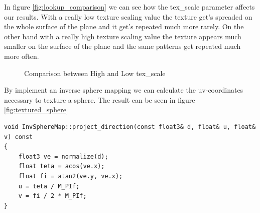 In figure \ref{fig:lookup_comparison} we can see how the tex\_scale parameter affects our results. With a really low texture scaling value the texture get's spreaded on the whole surface of the plane and it get's repeated much more rarely. On the other hand with a really high texture scaling value the texture appears much smaller on the surface of the plane and the same patterns get repeated much more often.
\begin{figure}[H]
	\centering
	\qquad
	
	\caption{Comparison between High and Low tex\_scale}%
	\label{fig:tex_scale_comparison}%
\end{figure}
By implement an inverse sphere mapping we can calculate the uv-coordinates necessary to texture a sphere. The result can be seen in figure \ref{fig:textured_sphere} 
\begin{lstlisting}
void InvSphereMap::project_direction(const float3& d, float& u, float& v) const
{
	float3 ve = normalize(d);
	float teta = acos(ve.x);
	float fi = atan2(ve.y, ve.x);
	u = teta / M_PIf;
	v = fi / 2 * M_PIf;
}
\end{lstlisting}


